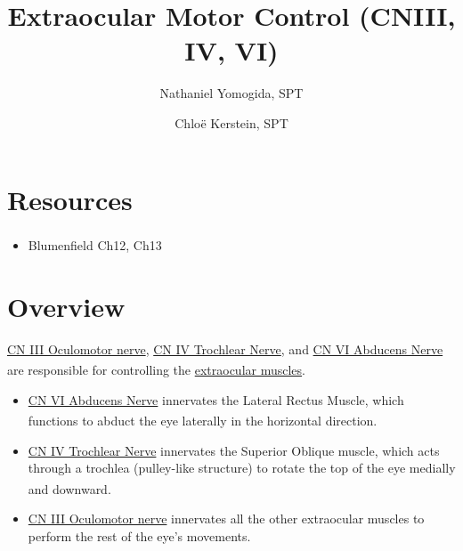\documentclass[
  letterpaper,
  DIV=11,
  numbers=noendperiod]{scrartcl}
\title{Extraocular Motor Control (CNIII, IV, VI)}
\author{Nathaniel Yomogida, SPT \and Chloë Kerstein, SPT}
\date{}
\providecommand{\tightlist}{%
  \setlength{\itemsep}{0pt}\setlength{\parskip}{0pt}}\usepackage{longtable,booktabs,array}
\renewcommand*\contentsname{Table of contents}
\newcommand\contentsname{Table of contents}
\begin{document}
\maketitle

\renewcommand*\contentsname{Table of contents}
{
\hypersetup{linkcolor=}
\setcounter{tocdepth}{3}
\tableofcontents
}
\section{Resources}\label{resources}

\begin{itemize}
\tightlist
\item
  Blumenfield Ch12,
  Ch13\textsuperscript{}
\end{itemize}

\section{Overview}\label{overview}

\href{../../../../../../Alchemy\%20Archive/Neuro/Neuroanatomy/Cranial\%20Nerves/CN3_Oculomotor.qmd}{CN
III Oculomotor nerve},
\href{../../../../../../Alchemy\%20Archive/Neuro/Neuroanatomy/Cranial\%20Nerves/CN4_Trochlear.qmd}{CN
IV Trochlear Nerve}, and
\href{../../../../../../Alchemy\%20Archive/Neuro/Neuroanatomy/Cranial\%20Nerves/CN6_Abducens.qmd}{CN
VI Abducens Nerve} are responsible for controlling the
\href{../../../../../../Alchemy\%20Archive/Anatomy/OIANs/Extraocular\%20muscles/extraocular_muscles.qmd}{extraocular
muscles}\textsuperscript{}.

\begin{itemize}
\tightlist
\item
  \href{../../../../../../Alchemy\%20Archive/Neuro/Neuroanatomy/Cranial\%20Nerves/CN6_Abducens.qmd}{CN
  VI Abducens Nerve} innervates the Lateral Rectus Muscle, which
  functions to abduct the eye laterally in the horizontal
  direction\textsuperscript{}.
\item
  \href{../../../../../../Alchemy\%20Archive/Neuro/Neuroanatomy/Cranial\%20Nerves/CN4_Trochlear.qmd}{CN
  IV Trochlear Nerve} innervates the Superior Oblique muscle, which acts
  through a trochlea (pulley-like structure) to rotate the top of the
  eye medially and
  downward\textsuperscript{}.
\item
  \href{../../../../../../Alchemy\%20Archive/Neuro/Neuroanatomy/Cranial\%20Nerves/CN3_Oculomotor.qmd}{CN
  III Oculomotor nerve} innervates all the other extraocular muscles to
  perform the rest of the eye's movements.
\end{itemize}
\end{document}
